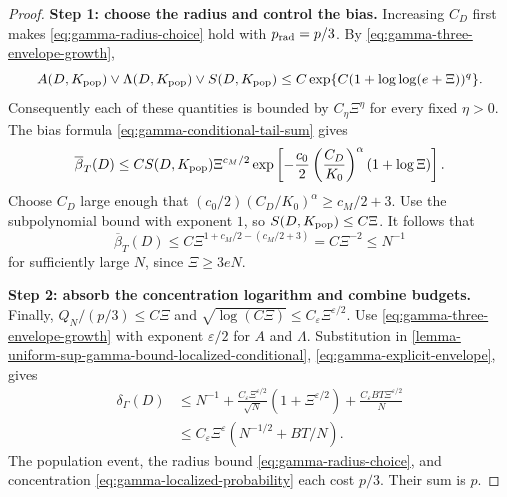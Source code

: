 \begin{proof}
\noindent\textbf{Step 1: choose the radius and control the bias.}
Increasing $C_D$ first makes \eqref{eq:gamma-radius-choice} hold with
$p_{\rm rad}=p/3$.  By \eqref{eq:gamma-three-envelope-growth},
\[
 A(D,K_{\rm pop})\vee\Lambda(D,K_{\rm pop})\vee S(D,K_{\rm pop})
 \le C\exp\{C(1+\log\log(e+\Xi))^q\}.
\]
Consequently each of these quantities is bounded by
$C_\eta\Xi^\eta$ for every fixed $\eta>0$.
The bias formula \eqref{eq:gamma-conditional-tail-sum} gives
\[
 \overline\beta_T(D)
 \le C S(D,K_{\rm pop})
 \Xi^{c_M/2}
 \exp\left[-\frac{c_0}{2}
  \left(\frac{C_D}{K_0}\right)^\alpha(1+\log\Xi)\right].
\]
Choose $C_D$ large enough that
$(c_0/2)(C_D/K_0)^\alpha\ge c_M/2+3$.
Use the subpolynomial bound with exponent $1$, so
$S(D,K_{\rm pop})\le C\Xi$. It follows that
\[
 \overline\beta_T(D)
 \le C\Xi^{1+c_M/2-(c_M/2+3)}
 =C\Xi^{-2}\le N^{-1}
\]
for sufficiently large $N$, since $\Xi\ge3eN$.

\par\noindent\textbf{Step 2: absorb the concentration logarithm and combine budgets.}
Finally, $Q_N/(p/3)\le C\Xi$ and
$\sqrt{\log(C\Xi)}\le C_\varepsilon\Xi^{\varepsilon/2}$.
Use \eqref{eq:gamma-three-envelope-growth} with exponent
$\varepsilon/2$ for $A$ and $\Lambda$. Substitution in
\cref{lemma-uniform-sup-gamma-bound-localized-conditional},
\eqref{eq:gamma-explicit-envelope}, gives
\[
\begin{aligned}
 \delta_\Gamma(D)
 &\le N^{-1}+\frac{C_\varepsilon\Xi^{\varepsilon/2}}{\sqrt N}
       (1+\Xi^{\varepsilon/2})
       +\frac{C_\varepsilon BT\Xi^{\varepsilon/2}}N\\
 &\le C_\varepsilon\Xi^\varepsilon(N^{-1/2}+BT/N).
\end{aligned}
\]
The population event, the radius bound \eqref{eq:gamma-radius-choice},
and concentration \eqref{eq:gamma-localized-probability} each cost $p/3$.
Their sum is $p$.
\end{proof}
